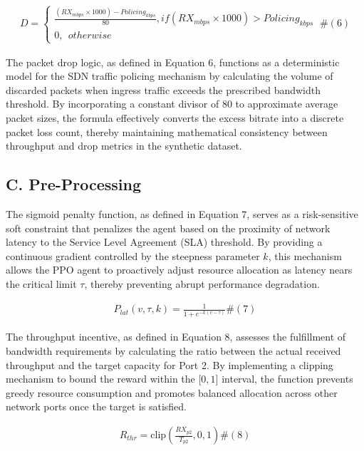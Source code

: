 \[\begin{array}{r}
D = \left\{ \begin{array}{r}
\frac{\left( {RX}_{mbps} \times 1000 \right) - {Policing}_{kbps}}{80},if\left( {RX}_{mbps} \times 1000 \right) > {Policing}_{kbps} \\
0,\ \ otherwise
\end{array} \right.\ \#(6)
\end{array}\]

The packet drop logic, as defined in Equation 6, functions as a deterministic model for the SDN traffic policing mechanism by calculating the volume of discarded packets when ingress traffic exceeds the prescribed bandwidth threshold. By incorporating a constant divisor of 80 to approximate average packet sizes, the formula effectively converts the excess bitrate into a discrete packet loss count, thereby maintaining mathematical consistency between throughput and drop metrics in the synthetic dataset.

\subsection{C. Pre-Processing}\label{c.-pre-processing}

The sigmoid penalty function, as defined in Equation 7, serves as a risk-sensitive soft constraint that penalizes the agent based on the proximity of network latency to the Service Level Agreement (SLA) threshold. By providing a continuous gradient controlled by the steepness parameter \(k\), this mechanism allows the PPO agent to proactively adjust resource allocation as latency nears the critical limit \(\tau\), thereby preventing abrupt performance degradation.

\[\begin{array}{r}
P_{lat}(v,\tau,k) = \frac{1}{1 + e^{- k(v - \tau)}}\#(7)
\end{array}\]

The throughput incentive, as defined in Equation 8, assesses the fulfillment of bandwidth requirements by calculating the ratio between the actual received throughput and the target capacity for Port 2. By implementing a clipping mechanism to bound the reward within the \(\lbrack 0,1\rbrack\) interval, the function prevents greedy resource consumption and promotes balanced allocation across other network ports once the target is satisfied.

\[\begin{array}{r}
R_{thr} = \text{clip}\left( \frac{RX_{p2}}{T_{p2}},0,1 \right)\#(8)
\end{array}\]

